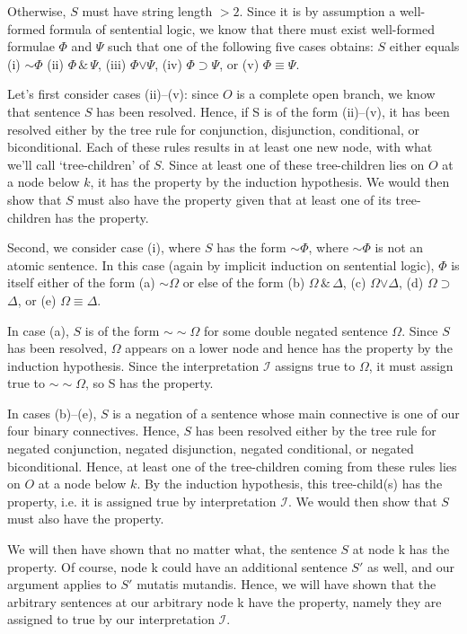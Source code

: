 \documentclass[12pt]{article}
\def\eor{\ensuremath{\vee}}
\def\eand{\ensuremath{\,\&\,}}
\def\eif{\ensuremath{\supset}}
\def\eiff{\ensuremath{\equiv}}
\def\enot{\ensuremath{{\sim}}} %
\let\oldsim\sim %
\renewcommand{\sim}{{\oldsim}} %
\def\metaA{\ensuremath{\varPhi}}
\def\metaB{\ensuremath{\varPsi}}
\def\metaC{\ensuremath{\varOmega}}
\def\metaD{\ensuremath{\varDelta}}
\newcommand*{\metav}[1]{\ensuremath{\mathcal{#1}}}
\begin{document}
\begin{enumerate}
Otherwise, $S$ must have string length $>2$. Since it is by assumption a well-formed formula of sentential logic, we know that there must exist well-formed formulae \metaA{} and \metaB{} such that one of the following five cases obtains: $S$ either equals (i) \enot\metaA{} (ii) \metaA{}\eand\metaB{}, (iii) \metaA{}\eor\metaB{}, (iv) \metaA{}\eif\metaB{}, or (v) \metaA{}\eiff\metaB{}. 

Let's first consider cases (ii)--(v): since $O$ is a complete open branch, we know that sentence $S $ has been resolved. Hence, if S is of the form (ii)--(v), it has been resolved either by the tree rule for conjunction, disjunction, conditional, or biconditional. Each of these rules results in at least one new node, with what we'll call `tree-children' of $S$. Since at least one of these tree-children lies on $O$ at a node below $k$, it  has the property by the induction hypothesis. We would then show that $S$ must also have the property given that at least one of its tree-children has the property. 

Second, we consider case (i), where $S$ has the form $\enot\metaA{}$, where $\enot\metaA{} $ is not an atomic sentence. In this case (again by implicit induction on sentential logic), $\metaA{}$ is itself either of the form (a) \enot \metaC{} or else of the form (b) \metaC{}\eand\metaD{}, (c) \metaC{}\eor\metaD{}, (d) \metaC{}\eif\metaD{}, or (e) \metaC{}\eiff\metaD{}. 

In case (a), $S$ is of the form $\enot \enot \metaC{}$ for some double negated sentence \metaC{}. Since $S$ has been resolved, \metaC{} appears on a lower node and hence has the property by the induction hypothesis. Since the interpretation \metav{I} assigns true to \metaC{}, it must assign true to $\enot \enot \metaC{}$, so S has the property. 

In cases (b)--(e), $S$ is a negation of a sentence whose main connective is one of our four binary connectives. Hence, $S$ has been resolved either by the tree rule for negated conjunction, negated disjunction, negated conditional, or negated biconditional. Hence, at least one of the tree-children coming from these rules lies on $O$ at a node below $k$. By the induction hypothesis, this tree-child(s) has the property, i.e. it is assigned true by interpretation \metav{I}. We would then show that $S$ must also have the property. 

We will then have shown that no matter what, the sentence $S$ at node k has the property. Of course, node k could have an additional sentence $S'$ as well, and our argument applies to $S'$ mutatis mutandis. Hence, we will have shown that the arbitrary sentences at our arbitrary node k have the property, namely they are assigned to true by our interpretation \metav{I}. 


\end{enumerate}
\end{document}
